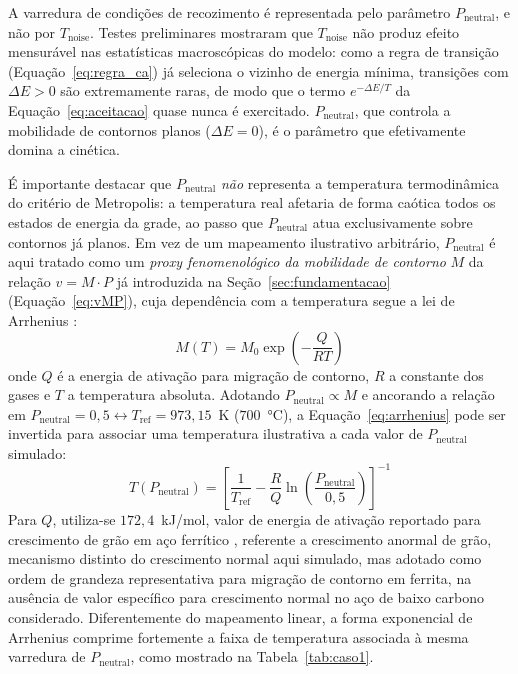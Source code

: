 \documentclass[12pt,a4paper]{article}
\begin{document}
A varredura de condições de recozimento é representada pelo parâmetro
$P_{\text{neutral}}$, e não por $T_{\text{noise}}$. Testes preliminares mostraram
que $T_{\text{noise}}$ não produz efeito mensurável nas estatísticas macroscópicas
do modelo: como a regra de transição (Equação~\ref{eq:regra_ca}) já seleciona o
vizinho de energia mínima, transições com $\Delta E > 0$ são extremamente raras, de
modo que o termo $e^{-\Delta E/T}$ da Equação~\ref{eq:aceitacao} quase nunca é
exercitado. $P_{\text{neutral}}$, que controla a mobilidade de contornos planos
($\Delta E = 0$), é o parâmetro que efetivamente domina a cinética.

É importante destacar que $P_{\text{neutral}}$ \emph{não} representa a temperatura
termodinâmica do critério de Metropolis: a temperatura real afetaria de forma
caótica todos os estados de energia da grade, ao passo que $P_{\text{neutral}}$ atua
exclusivamente sobre contornos já planos. Em vez de um mapeamento ilustrativo
arbitrário, $P_{\text{neutral}}$ é aqui tratado como um \emph{proxy fenomenológico da
mobilidade de contorno} $M$ da relação $v=M\cdot P$ já introduzida na
Seção~\ref{sec:fundamentacao} (Equação~\ref{eq:vMP}), cuja dependência com a
temperatura segue a lei de Arrhenius \cite{humphreys2004}:
\begin{equation}
    M(T) = M_0 \exp\!\left(-\frac{Q}{RT}\right)
    \label{eq:arrhenius}
\end{equation}
onde $Q$ é a energia de ativação para migração de contorno, $R$ a constante dos
gases e $T$ a temperatura absoluta. Adotando $P_{\text{neutral}} \propto M$ e
ancorando a relação em $P_{\text{neutral}}=0{,}5 \leftrightarrow T_{\text{ref}} =
973{,}15$~K ($700$~°C), a Equação~\ref{eq:arrhenius} pode ser invertida para
associar uma temperatura ilustrativa a cada valor de $P_{\text{neutral}}$ simulado:
\begin{equation}
    T(P_{\text{neutral}}) = \left[\frac{1}{T_{\text{ref}}} -
    \frac{R}{Q}\ln\!\left(\frac{P_{\text{neutral}}}{0{,}5}\right)\right]^{-1}
    \label{eq:arrhenius_inv}
\end{equation}
Para $Q$, utiliza-se $172{,}4$~kJ/mol, valor de energia de ativação reportado para
crescimento de grão em aço ferrítico \cite{oliveira2017}, referente a crescimento
anormal de grão, mecanismo distinto do crescimento normal aqui simulado, mas adotado
como ordem de grandeza representativa para migração de contorno em ferrita, na
ausência de valor específico para crescimento normal no aço de baixo carbono
considerado. Diferentemente do mapeamento linear, a forma exponencial de Arrhenius
comprime fortemente a faixa de temperatura associada à mesma varredura de
$P_{\text{neutral}}$, como mostrado na Tabela~\ref{tab:caso1}.
\end{document}
